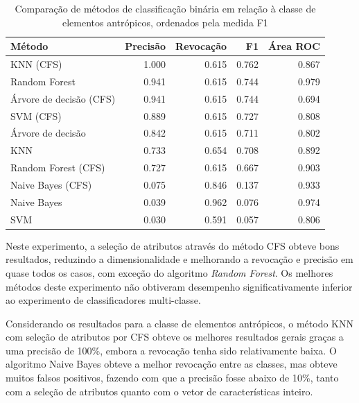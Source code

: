 \begin{table}[h]
\centering
\begin{tabulary}{\linewidth}{|L|R|R|R|R|}
\hline
\textbf{Método} & \textbf{Precisão} & \textbf{Revocação} & \textbf{F1} & \textbf{Área ROC} \\ \hline
KNN (CFS)               & 1.000 & 0.615 & 0.762 & 0.867 \\ \hline
Random Forest           & 0.941 & 0.615 & 0.744 & 0.979 \\ \hline
Árvore de decisão (CFS) & 0.941 & 0.615 & 0.744 & 0.694 \\ \hline
SVM (CFS)               & 0.889 & 0.615 & 0.727 & 0.808 \\ \hline
Árvore de decisão       & 0.842 & 0.615 & 0.711 & 0.802 \\ \hline
KNN                     & 0.733 & 0.654 & 0.708 & 0.892 \\ \hline
Random Forest (CFS)     & 0.727 & 0.615 & 0.667 & 0.903 \\ \hline
Naive Bayes (CFS)       & 0.075 & 0.846 & 0.137 & 0.933 \\ \hline
Naive Bayes             & 0.039 & 0.962 & 0.076 & 0.974 \\ \hline
SVM                     & 0.030 & 0.591 & 0.057 & 0.806 \\ \hline
\end{tabulary}
\caption{Comparação de métodos de classificação binária em relação à classe de elementos antrópicos, ordenados pela medida F1}
\label{tab:experimentoBiclasseAntropico}
\end{table}

Neste experimento, a seleção de atributos através do método CFS obteve bons resultados, reduzindo a dimensionalidade e melhorando a revocação e precisão em quase todos os casos, com exceção do algoritmo \textit{Random Forest}. Os melhores métodos deste experimento não obtiveram desempenho significativamente inferior ao experimento de classificadores multi-classe.

Considerando os resultados para a classe de elementos antrópicos, o método KNN com seleção de atributos por CFS obteve os melhores resultados gerais graças a uma precisão de 100\%, embora a revocação tenha sido relativamente baixa. O algoritmo Naive Bayes obteve a melhor revocação entre as classes, mas obteve muitos falsos positivos, fazendo com que a precisão fosse abaixo de 10\%, tanto com a seleção de atributos quanto com o vetor de características inteiro.

